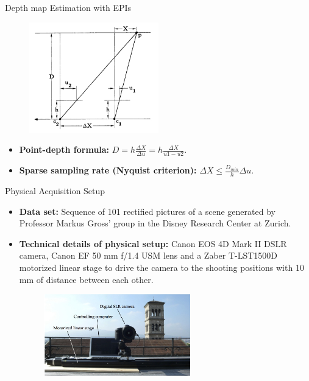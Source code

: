 \begin{frame}{Depth map Estimation with EPIs}
\begin{block}{}
\begin{figure}[h!]
\includegraphics[width=0.5\textwidth]{../../Diagrams/stereo-dist.jpg}
\end{figure}
\pause
\begin{itemize}
\item \textbf{Point-depth formula:} $D= h\frac{\Delta X}{\Delta u}=h\frac{\Delta X}{u1-u2}$.
\pause
\item \textbf{Sparse sampling rate (Nyquist criterion):} $\Delta X\leq \frac{D_{min}}{h}\Delta u$.
\end{itemize}
\end{block}
\end{frame}

\begin{frame}{Physical Acquisition Setup}
\begin{block}{}
\begin{itemize}
\item \textbf{Data set:} Sequence of 101 rectified pictures of a scene generated by Professor Markus Gross' group in the Disney Research Center at Zurich.
\pause
\item \textbf{Technical details of physical setup:} Canon EOS 4D Mark II DSLR camera, Canon EF 50 mm f/1.4 USM lens and a Zaber T-LST1500D motorized linear stage to drive the camera to the shooting positions with 10 mm of distance between each other. 
\pause
\begin{figure}[h!]
\includegraphics[width=0.6\textwidth]{../../Diagrams/setting.jpg}
\end{figure}
\end{itemize}
\end{block}
\end{frame}

